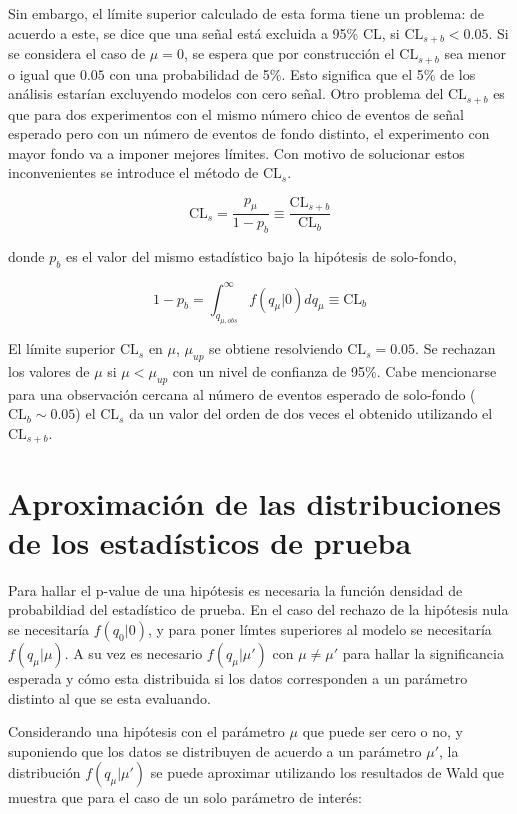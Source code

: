 Sin embargo, el límite superior calculado de esta forma tiene un problema: de acuerdo a este, se
dice que una señal está excluida a 95\% CL, si $\text{CL}_{s+b} < 0.05$. Si se considera el caso de $\mu = 0$, se espera
que por construcción el $\text{CL}_{s+b}$ sea menor o igual que $0.05$ con una probabilidad de 5\%. Esto significa
que el 5\% de los análisis estarían excluyendo modelos con cero señal. Otro problema del $\text{CL}_{s+b}$ es que
para dos experimentos con el mismo número chico de eventos de señal esperado pero con un número
de eventos de fondo distinto, el experimento con mayor fondo va a imponer mejores límites.
Con motivo de solucionar estos inconvenientes se introduce el método de $\text{CL}_{s}$.


\begin{equation}
	\text{CL}_{s} = \frac{p_{\mu}}{1-p_{b}} \equiv \frac{\text{CL}_{s+b}}{\text{CL}_{b}}
\end{equation}

donde $p_b$ es el valor del mismo estadístico bajo la hipótesis de solo-fondo,

\begin{equation}
	1-p_b = \int_{q_{\mu, obs}}^{\infty} f(q_\mu|0)dq_\mu \equiv \text{CL}_{b}
\end{equation}

El límite superior $\text{CL}_{s}$ en $\mu$, $\mu_{up}$ se obtiene resolviendo $\text{CL}_{s} = 0.05$. Se rechazan los valores de $\mu$ si
$\mu < \mu_{up}$ con un nivel de confianza de 95\%.
Cabe mencionarse para una observación cercana al número de eventos esperado de solo-fondo
($\text{CL}_{b} \sim 0.05$) el $\text{CL}_{s}$ da un valor del orden de dos veces el obtenido utilizando el $\text{CL}_{s+b}$.


\section{Aproximación de las distribuciones de los estadísticos de prueba}

Para hallar el p-value de una hipótesis es necesaria la función densidad de probabildiad del estadístico de prueba. En el caso del rechazo de la hipótesis nula se necesitaría $f(q_{0}|0)$, y para poner límtes superiores al modelo se necesitaría $f(q_{\mu}|\mu)$. A su vez es necesario $f(q_{\mu}|\mu')$ con $\mu\neq\mu'$ para hallar la significancia esperada y cómo esta distribuida si los datos corresponden a un parámetro distinto al que se esta evaluando. 

Considerando una hipótesis con el parámetro $\mu$ que puede ser cero o no, y suponiendo que los datos se distribuyen de acuerdo a un parámetro $\mu'$, la distribución $f(q_{\mu}|\mu')$ se puede aproximar utilizando los resultados de Wald %
que muestra que para el caso de un solo parámetro de interés:

